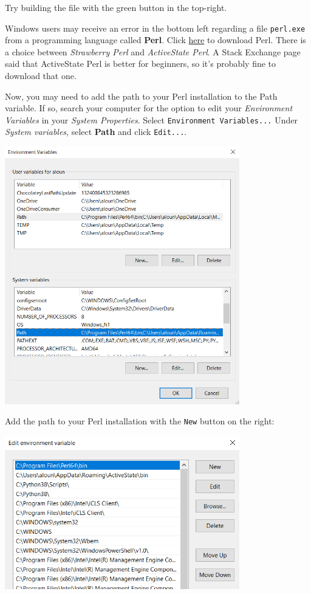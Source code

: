 \documentclass{article} 		%
\begin{document}
Try building the file with the green button in the top-right. \par
Windows users may receive an error in the bottom left regarding a file \texttt{perl.exe} from a programming language called \textbf{Perl}. 
Click \href{https://www.perl.org/get.html}{here} to download Perl. There is a choice between \textit{Strawberry Perl} and \textit{ActiveState Perl}. A Stack Exchange page said that ActiveState Perl is better for beginners, so it's probably fine to download that one. \par
Now, you may need to add the path to your Perl installation to the Path variable. If so, search your computer for the option to edit your \textit{Environment Variables} in your \textit{System Properties}. Select \texttt{Environment Variables...} Under \textit{System variables}, select \textbf{Path} and click \texttt{Edit...}. 
\begin{center}
	\includegraphics[width=0.765\textwidth]{perl1.png}
\end{center}
Add the path to your Perl installation with the \texttt{New} button on the right:
\begin{center}
	\includegraphics[width=0.765\textwidth]{perl2crop.png}
\end{center}
\end{document}
